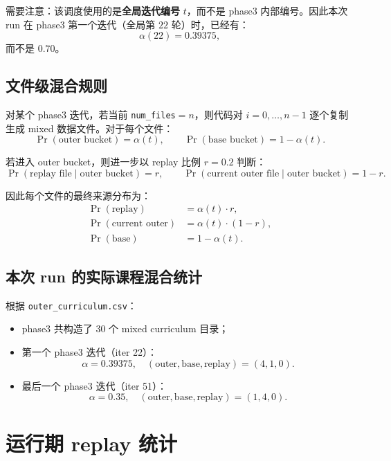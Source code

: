 \documentclass[11pt,a4paper]{ctexart}
\begin{document}
需要注意：该调度使用的是\textbf{全局迭代编号} \(t\)，而不是 phase3 内部编号。因此本次 run 在 phase3 第一个迭代（全局第 \(22\) 轮）时，已经有：
\[
\alpha(22)=0.39375,
\]
而不是 \(0.70\)。

\subsection{文件级混合规则}
对某个 phase3 迭代，若当前 \texttt{num\_files}\(=n\)，则代码对 \(i=0,\dots,n-1\) 逐个复制生成 mixed 数据文件。对于每个文件：
\[
\Pr(\text{outer bucket})=\alpha(t),\qquad
\Pr(\text{base bucket})=1-\alpha(t).
\]

若进入 outer bucket，则进一步以 replay 比例 \(r=0.2\) 判断：
\[
\Pr(\text{replay file}\mid \text{outer bucket})=r,\qquad
\Pr(\text{current outer file}\mid \text{outer bucket})=1-r.
\]

因此每个文件的最终来源分布为：
\begin{align}
\Pr(\text{replay}) &= \alpha(t)\cdot r,\\
\Pr(\text{current outer}) &= \alpha(t)\cdot (1-r),\\
\Pr(\text{base}) &= 1-\alpha(t).
\end{align}

\subsection{本次 run 的实际课程混合统计}
根据 \texttt{outer\_curriculum.csv}：
\begin{itemize}[leftmargin=2.2em,itemsep=0.2em]
    \item phase3 共构造了 \(30\) 个 mixed curriculum 目录；
    \item 第一个 phase3 迭代（iter 22）：
    \[
    \alpha=0.39375,\quad (\text{outer},\text{base},\text{replay})=(4,1,0).
    \]
    \item 最后一个 phase3 迭代（iter 51）：
    \[
    \alpha=0.35,\quad (\text{outer},\text{base},\text{replay})=(1,4,0).
    \]
\end{itemize}

\section{运行期 replay 统计}
\end{document}
